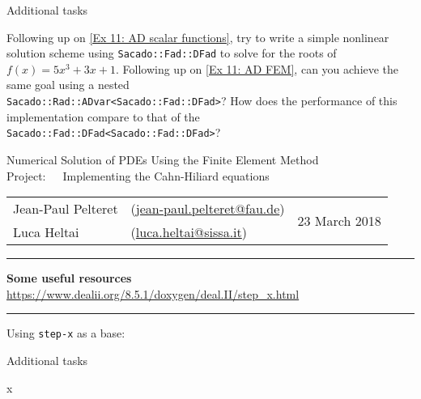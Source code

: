 \documentclass[11pt,answers]{exam}
\makeatletter
\newcommand{\FINISHME}[1]{\textcolor{red}{#1}}
\newcommand{\makeprojectheader}[2]{%
\begin{center}
{\sc Numerical Solution of PDEs Using the Finite Element Method}\vspace{2ex}\\
{\sc Project:\ \ \ #1}\vspace{2ex}\\
\begin{tabular*}{\textwidth}{ll @{\extracolsep{\fill}}r}
Jean-Paul Pelteret & (\url{jean-paul.pelteret@fau.de}) & \multirow{2}{*}{#2} \\
Luca Heltai & (\url{luca.heltai@sissa.it}) & \\
\end{tabular*}
\end{center}
}
\newcommand{\makeresources}[1]{%
\rule{\textwidth}{0.6mm}
\textbf{Some useful resources}\\[1.5ex]
#1 \\
\rule{\textwidth}{0.6mm}
}
\makeatother
\begin{document}
\begin{questions}

\question Additional tasks
\begin{parts}
\bonuspart Following up on \ref{Ex 11: AD scalar functions}, try to write a simple nonlinear solution scheme using \verb|Sacado::Fad::DFad| to solve for the roots of $f(x) = 5x^3 + 3x + 1$.
\bonuspart Following up on \ref{Ex 11: AD FEM}, can you achieve the same goal using a nested\\ \verb|Sacado::Rad::ADvar<Sacado::Fad::DFad>|? How does the performance of this implementation compare to that of the \verb|Sacado::Fad::DFad<Sacado::Fad::DFad>|?
\end{parts}

\end{questions}




\clearpage
\makeprojectheader{Implementing the Cahn-Hiliard equations}{23 March 2018}
\makeresources{%
\url{https://www.dealii.org/8.5.1/doxygen/deal.II/step_x.html}
}

\begin{questions}

\question Using \verb|step-x| as a base:

\question Additional tasks
\begin{parts}
\bonuspart x
\end{parts}

\end{questions}
\end{document}
